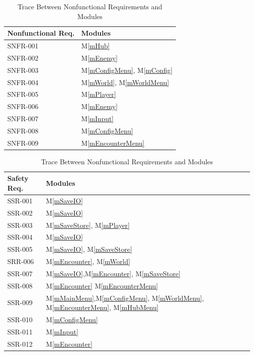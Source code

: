 \documentclass[12pt, titlepage]{article}
\newcommand{\mref}[1]{M\ref{#1}}
\begin{document}
\begin{table}[H]
\centering
\begin{tabular}{p{} p{}}
\toprule
\textbf{Nonfunctional Req.} & \textbf{Modules}\\
\midrule
SNFR-001 & \mref{mHub}\\
SNFR-002 & \mref{mEnemy}\\
SNFR-003 & \mref{mConfigMenu}, \mref{mConfig}\\
SNFR-004 & \mref{mWorld}, \mref{mWorldMenu}\\
SNFR-005 & \mref{mPlayer}\\
SNFR-006 & \mref{mEnemy}\\
SNFR-007 & \mref{mInput}\\
SNFR-008 & \mref{mConfigMenu}\\
SNFR-009 & \mref{mEncounterMenu}\\

\bottomrule
\end{tabular}
\caption{Trace Between Nonfunctional Requirements and Modules}
\label{TblRT}
\end{table}

\begin{table}[H]
\centering
\begin{tabular}{p{} p{}}
\toprule
\textbf{Safety Req.} & \textbf{Modules}\\
\midrule
SSR-001 & \mref{mSaveIO} \\
SSR-002 & \mref{mSaveIO} \\
SSR-003 & \mref{mSaveStore}, \mref{mPlayer} \\
SSR-004 & \mref{mSaveIO} \\
SSR-005 & \mref{mSaveIO}, \mref{mSaveStore}\\
SRR-006 & \mref{mEncounter}, \mref{mWorld} \\
SSR-007 & \mref{mSaveIO},\mref{mEncounter}, \mref{mSaveStore}\\
SSR-008 & \mref{mEncounter} \mref{mEncounterMenu}\\
SSR-009 & \mref{mMainMenu},\mref{mConfigMenu}, \mref{mWorldMenu}, \mref{mEncounterMenu}, \mref{mHubMenu}\\
SSR-010 & \mref{mConfigMenu}\\
SSR-011 & \mref{mInput}\\
SSR-012 & \mref{mEncounter}\\
\bottomrule
\end{tabular}
\caption{Trace Between Nonfunctional Requirements and Modules}
\label{TblRT}
\end{table}
\end{document}

